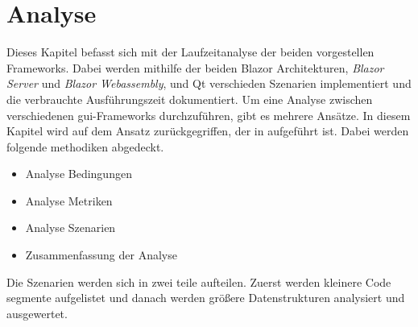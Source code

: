 \chapter{Analyse}
\label{chp:analyse}
Dieses Kapitel befasst sich mit der Laufzeitanalyse der beiden vorgestellen Frameworks. Dabei
werden mithilfe der beiden Blazor Architekturen, \emph{Blazor Server} und \emph{Blazor
Webassembly}, und Qt verschieden Szenarien implementiert und die verbrauchte Ausführungszeit
dokumentiert.
\newline
\newline
Um eine Analyse zwischen verschiedenen \ac{gui}-Frameworks durchzuführen, gibt es mehrere Ansätze.
In diesem Kapitel wird auf dem Ansatz zurückgegriffen, der in \cite{JavaVsCSharp} aufgeführt ist. Dabei werden
folgende methodiken abgedeckt.

\begin{itemize}
    \item Analyse Bedingungen
    \item Analyse Metriken
    \item Analyse Szenarien
    \item Zusammenfassung der Analyse
\end{itemize}

Die Szenarien werden sich in zwei teile aufteilen. Zuerst werden kleinere Code segmente
aufgelistet und danach werden größere Datenstrukturen analysiert und ausgewertet.




